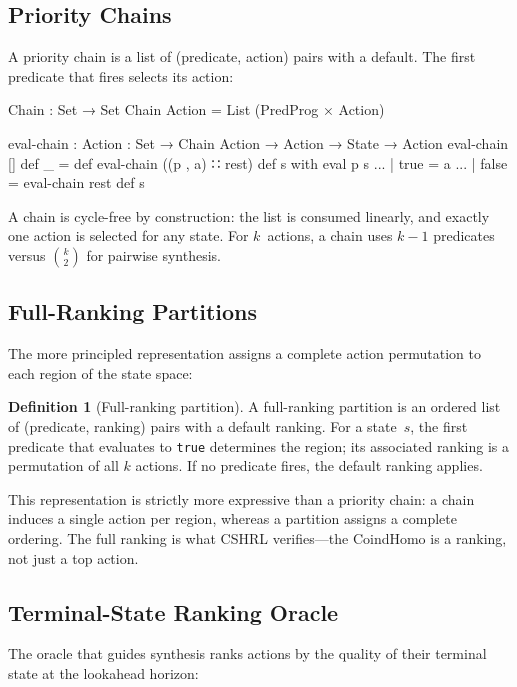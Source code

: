 \documentclass[9pt,a4paper]{article}
\theoremstyle{plain}
\theoremstyle{definition}
\newtheorem{definition}{Definition}
\theoremstyle{remark}
\begin{document}
\subsection{Priority Chains}

A priority chain is a list of (predicate, action) pairs with a
default. The first predicate that fires selects its action:

\begin{spec}
  Chain : Set → Set
  Chain Action = List (PredProg × Action)

  eval-chain : {Action : Set} → Chain Action → Action
               → State → Action
  eval-chain []               def _ = def
  eval-chain ((p , a) ∷ rest) def s with eval p s
  ... | true  = a
  ... | false = eval-chain rest def s
\end{spec}

A chain is cycle-free by construction: the list is consumed
linearly, and exactly one action is selected for any state.
For $k$~actions, a chain uses $k{-}1$ predicates versus
$\binom{k}{2}$ for pairwise synthesis.

\subsection{Full-Ranking Partitions}

The more principled representation assigns a complete action
permutation to each region of the state space:

\begin{definition}[Full-ranking partition]
A full-ranking partition is an ordered list of (predicate,
ranking) pairs with a default ranking. For a state~$s$, the
first predicate that evaluates to \texttt{true} determines
the region; its associated ranking is a permutation of all
$k$ actions. If no predicate fires, the default ranking applies.
\end{definition}

This representation is strictly more expressive than a priority
chain: a chain induces a single action per region, whereas a
partition assigns a complete ordering. The full ranking is what
CSHRL verifies---the CoindHomo is a ranking, not just a top
action.

\subsection{Terminal-State Ranking Oracle}
\label{sec:terminal}

The oracle that guides synthesis ranks actions by the quality
of their terminal state at the lookahead horizon:
\end{document}
